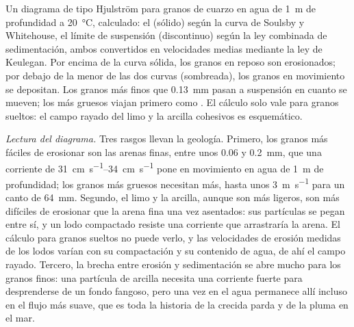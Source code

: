 \begin{omfigure}
{\small Un diagrama de tipo Hjulström para granos de cuarzo en agua de \qty{1}{m} de profundidad a \qty{20}{\celsius}, calculado: el 
(sólido) según la curva de Soulsby y Whitehouse, el límite de suspensión (discontinuo) según la ley combinada de sedimentación, ambos convertidos en velocidades
medias mediante la ley de Keulegan. Por encima de la curva sólida, los granos en reposo son erosionados; por debajo de la menor de las dos curvas (sombreada),
los granos en movimiento se depositan. Los granos más finos que \qty{0.13}{mm} pasan a suspensión en cuanto se mueven; los más gruesos viajan primero como . El cálculo solo vale para granos sueltos: el campo rayado del limo y la arcilla cohesivos es esquemático.}
\label{fig:b1:erosion-transport:hjulstrom}
\end{omfigure}

\emph{Lectura del diagrama.} Tres rasgos llevan la geología. Primero, los granos más fáciles de erosionar son las arenas finas, entre unos \num{0.06} y
\qty{0.2}{mm}, que una corriente de \qtyrange{31}{34}{cm.s^{-1}} pone en movimiento en agua de \qty{1}{m} de profundidad; los granos más gruesos necesitan más,
hasta unos \qty{3}{m.s^{-1}} para un canto de \qty{64}{mm}. Segundo, el limo y la arcilla, aunque son más ligeros, son más difíciles de erosionar que la arena
fina una vez asentados: sus partículas se pegan entre sí, y un lodo compactado resiste una corriente que arrastraría la arena. El cálculo para granos sueltos no
puede verlo, y las velocidades de erosión medidas de los lodos varían con su compactación y su contenido de agua, de ahí el campo rayado. Tercero, la brecha entre
erosión y sedimentación se abre mucho para los granos finos: una partícula de arcilla necesita una corriente fuerte para desprenderse de un fondo fangoso, pero una
vez en el agua permanece allí incluso en el flujo más suave, que es toda la historia de la crecida parda y de la pluma en el mar.

